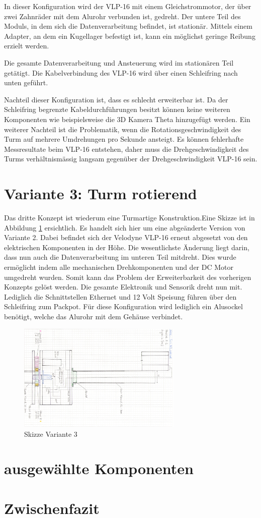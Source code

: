 In dieser Konfiguration wird der VLP-16 mit einem Gleichstrommotor, der über zwei Zahnräder mit dem Alurohr verbunden ist, gedreht. Der untere Teil des Moduls, in dem sich die Datenverarbeitung befindet, ist stationär. Mittels einem Adapter, an dem ein Kugellager befestigt ist, kann ein möglichst geringe Reibung erzielt werden.

Die gesamte Datenverarbeitung und Ansteuerung wird im stationären Teil getätigt. Die Kabelverbindung des VLP-16 wird über einen Schleifring nach unten geführt. 

Nachteil dieser Konfiguration ist, dass es schlecht erweiterbar ist. Da der Schleifring begrenzte Kabeldurchführungen besitzt können keine weiteren Komponenten wie beispielsweise die 3D Kamera Theta hinzugefügt werden. Ein weiterer Nachteil ist die Problematik, wenn die Rotationsgeschwindigkeit des Turm auf mehrere Umdrehungen pro Sekunde ansteigt. Es können fehlerhafte Messresultate beim VLP-16 entstehen, daher muss die Drehgeschwindigkeit des Turms verhältnismässig langsam gegenüber der Drehgeschwindigkeit VLP-16 sein.


\section {Variante 3: Turm rotierend}
\label{sec:var3}
Das dritte Konzept ist wiederum eine Turmartige Konstruktion.Eine Skizze ist in Abbildung \ref{fig:skizze_rotierend} ersichtlich. Es handelt sich hier um eine abgeänderte Version von Variante 2. Dabei befindet sich der Velodyne VLP-16 erneut abgesetzt von den elektrischen Komponenten in der Höhe. Die wesentlichste Änderung liegt darin, dass nun auch die Datenverarbeitung im unteren Teil mitdreht. Dies wurde ermöglicht indem alle mechanischen Drehkomponenten und der DC Motor umgedreht wurden. Somit kann das Problem der Erweiterbarkeit des vorherigen Konzepts gelöst werden. Die gesamte Elektronik und Sensorik dreht nun mit. Lediglich die Schnittstellen Ethernet und 12 Volt Speisung führen über den Schleifring zum Packpot. 
Für diese Konfiguration wird lediglich ein Alusockel benötigt, welche das Alurohr mit dem Gehäuse verbindet.


\begin{figure}[H]
	\centering
	\includegraphics[angle=90,width=0.7\textwidth]{resources/skizze_rotierend.PNG}
	\caption{Skizze Variante 3 }
	\label{fig:skizze_rotierend}
\end{figure} 

\section {ausgewählte Komponenten}
\label{sec:ausgewählteKomponenten}

\section{Zwischenfazit}
\label{ZwischenfazitKonz}

